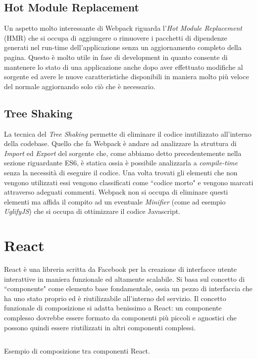 \subsection{Hot Module Replacement}
Un aspetto molto interessante di Webpack riguarda l'\textit{Hot Module Replacement} (HMR) che si occupa di aggiungere o rimuovere i pacchetti di dipendenze generati nel run-time dell'applicazione senza un aggiornamento completo della pagina. Questo è molto utile in fase di development in quanto consente di mantenere lo stato di una applicazione anche dopo aver effettuato modifiche al sorgente ed avere le nuove caratteristiche disponibili in maniera molto più veloce del normale aggiornando solo ciò che è necessario. 



\subsection{Tree Shaking}
La tecnica del \textit{Tree Shaking} permette di eliminare il codice inutilizzato all'interno della codebase. Quello che fa Webpack è andare ad analizzare la struttura di \textit{Import} ed \textit{Export} del sorgente che, come abbiamo detto precedentemente nella sezione riguardante ES6, è statica ossia è possibile analizzarla a \textit{compile-time} senza la necessità di eseguire il codice. Una volta trovati gli elementi che non vengono utilizzati essi vengono classificati come “codice morto" e vengono marcati attraverso adeguati commenti. Webpack non si occupa di eliminare questi elementi ma affida il compito ad un eventuale \textit{Minifier} (come ad esempio \textit{UglifyJS}) che si occupa di ottimizzare il codice Javascript.

\section{React}
React è una libreria scritta da Facebook per la creazione di interfacce utente interattive in maniera funzionale ed altamente scalabile. Si basa sul concetto di “componente" come elemento base fondamentale, ossia un pezzo di interfaccia che ha uno stato proprio ed è riutilizzabile all'interno del servizio. Il concetto funzionale di composizione si adatta benissimo a React: un componente complesso dovrebbe essere formato da componenti più piccoli e agnostici che possono quindi essere riutilizzati in altri componenti complessi.

\begin{listing}[ht]
\inputminted{jsx}{sources/exampleReactComponents.js}
\caption{Esempio di composizione tra componenti React.}
\label{exampleReactComponents}
\end{listing}

